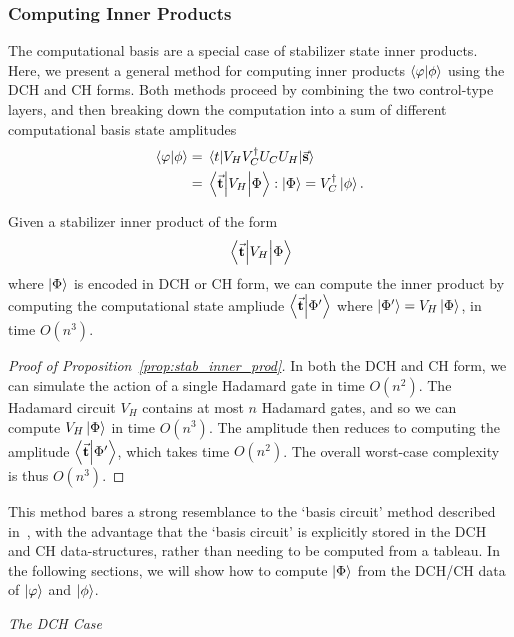 \subsubsection*{Computing Inner Products}
The computational basis are a special case of stabilizer state inner products. Here, we present a general method for computing inner products $\braket{\varphi}{\phi}$ using the DCH and CH forms. Both methods proceed by combining the two control-type layers, and then breaking down the computation into a sum of different computational basis state amplitudes
\begin{align*}
\braket{\varphi}{\phi} &= \matrixel{t}{V_{H}V_{C}^{\dagger}U_{C}U_{H}}{\va{s}} \\
&= \matrixel{\va{t}}{V_{H}}{\Phi} : \ket{\Phi} = V_{C}^{\dagger} \ket{\phi}.
\end{align*}
\begin{prop}
Given a stabilizer inner product of the form
\[\matrixel{\va{t}}{V_{H}}{\Phi}\]
where $\ket{\Phi}$ is encoded in DCH or CH form, we can compute the inner product by computing the computational state ampliude $\braket{\va{t}}{\Phi'}$ where $\ket{\Phi'}=V_{H}\ket{\Phi}$, in time $O(n^{3})$.\label{prop:stab_inner_prod}
\end{prop}
\begin{proof}[Proof of Proposition~\ref{prop:stab_inner_prod}]
In both the DCH and CH form, we can simulate the action of a single Hadamard gate in time $O(n^{2})$. The Hadamard circuit $V_{H}$ contains at most $n$ Hadamard gates, and so we can compute $V_{H}\ket{\Phi}$ in time $O(n^{3})$. The amplitude then reduces to computing the amplitude $\braket{\va{t}}{\Phi'}$, which takes time $O(n^{2})$. The overall worst-case complexity is thus $O(n^{3})$.
\end{proof}
This method bares a strong resemblance to the `basis circuit' method described in~\cite{Garcia2012}, with the advantage that the `basis circuit' is explicitly stored in the DCH and CH data-structures, rather than needing to be computed from a  tableau. In the following sections, we will show how to compute $\ket{\Phi}$ from the DCH/CH data of $\ket{\varphi}$ and $\ket{\phi}$.\par
\large{\itshape{The DCH Case}}\\
